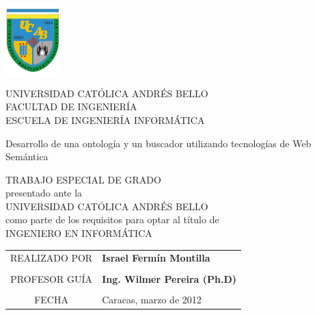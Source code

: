\begin{center}
\parbox{4cm}{\includegraphics[width=0.16\textwidth]{images/escudoUcab.jpg}}\parbox{9cm}{\begin{center}
UNIVERSIDAD CATÓLICA ANDRÉS BELLO \\
FACULTAD DE INGENIERÍA \\
ESCUELA DE INGENIERÍA INFORMÁTICA \\
\end{center}}

\vspace{\fill}


\begin{LARGE}
Desarrollo de una ontología y un buscador utilizando tecnologías de Web Semántica
\end{LARGE}

\vspace{\fill}

TRABAJO ESPECIAL DE GRADO\\
presentado ante la\\
UNIVERSIDAD CATÓLICA ANDRÉS BELLO\\
como parte de los requisitos para optar al t\'itulo de\\
INGENIERO EN INFORM\'ATICA

\vspace{\fill}

{
\begin{tabular}{cl}
REALIZADO POR & \textbf{Israel Fermín Montilla}\tabularnewline
\multicolumn{2}{c}{}\tabularnewline
PROFESOR GUÍA & \textbf{Ing. Wilmer Pereira (Ph.D)}\tabularnewline
\multicolumn{2}{c}{}\tabularnewline
FECHA & Caracas, marzo de 2012\tabularnewline
\end{tabular}
}


\end{center}
